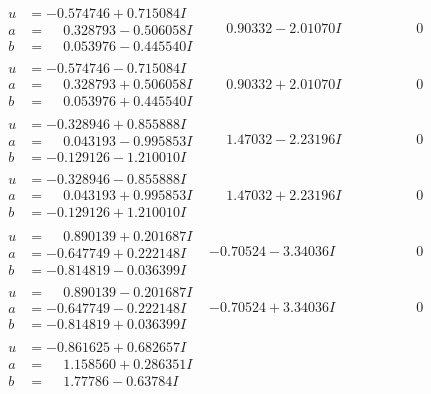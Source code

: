 \documentclass[1p]{elsarticle_modified}
\theoremstyle{definition}
\begin{document}
$$\begin{array}{c|c|c}
 \hline 
\begin{aligned}
u &= -0.574746 + 0.715084 I \\
a &= \phantom{-}0.328793 - 0.506058 I \\
b &= \phantom{-}0.053976 - 0.445540 I\end{aligned}
 & \phantom{-}0.90332 - 2.01070 I & \phantom{-0.000000 } 0 \\ \hline\begin{aligned}
u &= -0.574746 - 0.715084 I \\
a &= \phantom{-}0.328793 + 0.506058 I \\
b &= \phantom{-}0.053976 + 0.445540 I\end{aligned}
 & \phantom{-}0.90332 + 2.01070 I & \phantom{-0.000000 } 0 \\ \hline\begin{aligned}
u &= -0.328946 + 0.855888 I \\
a &= \phantom{-}0.043193 - 0.995853 I \\
b &= -0.129126 - 1.210010 I\end{aligned}
 & \phantom{-}1.47032 - 2.23196 I & \phantom{-0.000000 } 0 \\ \hline\begin{aligned}
u &= -0.328946 - 0.855888 I \\
a &= \phantom{-}0.043193 + 0.995853 I \\
b &= -0.129126 + 1.210010 I\end{aligned}
 & \phantom{-}1.47032 + 2.23196 I & \phantom{-0.000000 } 0 \\ \hline\begin{aligned}
u &= \phantom{-}0.890139 + 0.201687 I \\
a &= -0.647749 + 0.222148 I \\
b &= -0.814819 - 0.036399 I\end{aligned}
 & -0.70524 - 3.34036 I & \phantom{-0.000000 } 0 \\ \hline\begin{aligned}
u &= \phantom{-}0.890139 - 0.201687 I \\
a &= -0.647749 - 0.222148 I \\
b &= -0.814819 + 0.036399 I\end{aligned}
 & -0.70524 + 3.34036 I & \phantom{-0.000000 } 0 \\ \hline\begin{aligned}
u &= -0.861625 + 0.682657 I \\
a &= \phantom{-}1.158560 + 0.286351 I \\
b &= \phantom{-}1.77786 - 0.63784 I\end{aligned}

\end{array}$$
\end{document}
